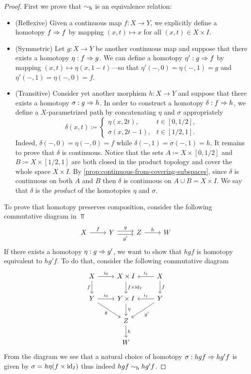 \begin{proof}
First we prove that \(\sim_{\text{h}}\) is an equivalence relation:
\begin{itemize}\setlength\itemsep{0em}
\item (Reflexive) Given a continuous map \(f: X \to Y\), we explicitly define a
  homotopy \(f \Rightarrow f\) by mapping \((x, t) \mapsto x\) for all
  \((x, t) \in X \times I\).

\item (Symmetric) Let \(g: X \to Y\) be another continuous map and suppose that
  there exists a homotopy \(\eta: f \Rightarrow g\). We can define a homotopy \(\eta':
  g \Rightarrow f\) by mapping \((x, t) \mapsto \eta(x, 1 - t)\)---so that \(\eta'(-,
  0) = \eta(-, 1) = g\) and \(\eta'(-, 1) = \eta(-, 0) = f\).

\item (Transitive) Consider yet another morphism \(h: X \to Y\) and suppose that
  there exists a homotopy \(\sigma: g \Rightarrow h\). In order to construct a homotopy
  \(\delta: f \Rightarrow h\), we define a \(X\)-parametrized path by concatenating
  \(\eta\) and \(\sigma\) appropriately
  \[
  \delta(x, t) \coloneq
  \begin{cases}
    \eta(x, 2 t), & t \in [0, 1/2], \\
    \sigma(x, 2 t - 1), & t \in [1/2, 1].
  \end{cases}
  \]
  Indeed, \(\delta(-, 0) = \eta(-, 0) = f\) while
  \(\delta(-, 1) = \sigma(-, 1) = h\). It remains to prove that \(\delta\) is
  continuous. Notice that the sets \(A \coloneq X \times [0, 1/2]\) and
  \(B \coloneq X \times [1/2, 1]\) are both closed in the product topology and
  cover the whole space \(X \times I\). By
  \cref{prop:continuous-from-covering-subspaces}, since \(\delta\)
  is continuous on both \(A\) and \(B\) then \(\delta\) is continuous on
  \(A \cup B = X \times I\). We say that \(\delta\) is the \emph{product} of the
  homotopies \(\eta\) and \(\sigma\).
\end{itemize}
To prove that homotopy preserves composition, consider the following commutative
diagram in \(\Top\)
\[
\begin{tikzcd}
X \ar[r, "f"]
&Y \ar[r, shift left, "g"] \ar[r, shift right, "g'"']
&Z \ar[r, "h"]
&W
\end{tikzcd}
\]
If there exists a homotopy \(\eta: g \Rightarrow g'\), we want to show that \(h g f\)
is homotopy equivalent to \(h g' f\). To do that, consider the following
commutative diagram
\[
\begin{tikzcd}
X \ar[r, "i_0"] \ar[d, "f"']
&X \times I \ar[d, "f \times \Id_I"]
&X \ar[l, "i_1"'] \ar[d, "f"]
\\
Y \ar[r, "i_0"] \ar[dr, "g"']
&Y \times I \ar[d, "\eta"]
&Y \ar[l, "i_1"'] \ar[dl, "g'"]
\\
&Z \ar[d, "h"] &
\\
&W &
\end{tikzcd}
\]
From the diagram we see that a natural choice of homotopy
\(\sigma: h g f \Rightarrow h g' f\) is given by \(\sigma = h \eta (f \times \operatorname{id}_I)\)
thus indeed \(h g f \sim_{\text{h}} h g' f\).
\end{proof}

